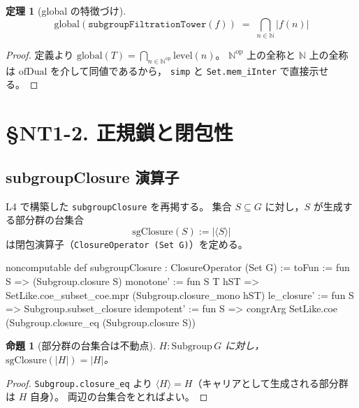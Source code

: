 \documentclass[a4paper,11pt]{ltjsarticle}
\theoremstyle{definition}
\theoremstyle{plain}
\newtheorem{theorem}[definition]{定理}
\newtheorem{proposition}[definition]{命題}
\theoremstyle{remark}
\newcommand{\sgcl}{\mathrm{sgClosure}}
\begin{document}
\begin{theorem}[global の特徴づけ]\label{thm:global-characterization}
  \[
    \mathrm{global}(\texttt{subgroupFiltrationTower}(f))
    \;=\;
    \bigcap_{n \in \mathbb{N}} \lvert f(n)\rvert
  \]
\end{theorem}

\begin{proof}
  定義より $\mathrm{global}(T) = \bigcap_{n \in \mathbb{N}^{\mathrm{op}}} \mathrm{level}(n)$。
  $\mathbb{N}^{\mathrm{op}}$ 上の全称と $\mathbb{N}$ 上の全称は $\mathrm{ofDual}$ を介して同値であるから，
  \texttt{simp} と \texttt{Set.mem\_iInter} で直接示せる。
\end{proof}

\section{§NT1-2. 正規鎖と閉包性}

\subsection{subgroupClosure 演算子}

L4 で構築した \texttt{subgroupClosure} を再掲する。
集合 $S \subseteq G$ に対し，$S$ が生成する部分群の台集合
\[
  \sgcl(S) := \lvert\langle S \rangle\rvert
\]
は閉包演算子（\texttt{ClosureOperator (Set G)}）を定める。

\begin{leancode}
noncomputable def subgroupClosure : ClosureOperator (Set G) :=
  {
    toFun := fun S => (Subgroup.closure S)
    monotone' := fun S T hST =>
      SetLike.coe_subset_coe.mpr (Subgroup.closure_mono hST)
    le_closure' := fun S => Subgroup.subset_closure
    idempotent' := fun S =>
      congrArg SetLike.coe (Subgroup.closure_eq (Subgroup.closure S))
  }
\end{leancode}

\begin{proposition}[部分群の台集合は不動点]\label{prop:carrier-fixedpoint}
  $H : \mathrm{Subgroup}\,G$ に対し，$\sgcl(\lvert H\rvert) = \lvert H\rvert$。
\end{proposition}

\begin{proof}
  \texttt{Subgroup.closure\_eq} より $\langle H \rangle = H$（キャリアとして生成される部分群は $H$ 自身）。
  両辺の台集合をとればよい。
\end{proof}
\end{document}
